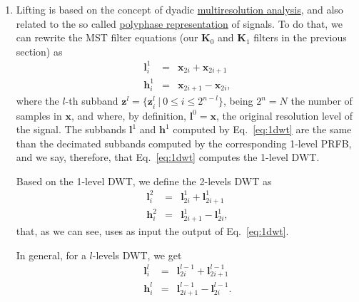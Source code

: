 \begin{enumerate}

\item Lifting is based on the concept of dyadic
  \href{https://en.wikipedia.org/wiki/Multiresolution_analysis}{multiresolution
    analysis}, and also related to the so called
  \href{https://en.wikipedia.org/wiki/Polyphase_matrix}{polyphase
    representation} of signals. To do that, we can rewrite
  the MST filter equations (our ${\mathbf K}_0$ and ${\mathbf K}_1$
  filters in the previous section) as
  \begin{equation}
    \begin{array}{rcl}
      {\mathbf l}^1_i & = & {\mathbf x}_{2i} + {\mathbf x}_{2i+1} \\
      {\mathbf h}^1_i & = & {\mathbf x}_{2i+1} - {\mathbf x}_{2i},
    \end{array}
    \label{eq:1dwt}
  \end{equation}
  where the $l$-th subband
  ${\mathbf z}^l=\{{\mathbf z}_i^l~|~0\le i\le 2^{n-l}\}$, being
  $2^n=N$ the number of samples in ${\mathbf x}$, and where, by
  definition, ${\mathbf l}^0={\mathbf x}$, the original resolution
  level of the signal. The subbands ${\mathbf l}^1$ and
  ${\mathbf h}^1$ computed by Eq.~\eqref{eq:1dwt} are the same than
  the decimated subbands computed by the corresponding 1-level PRFB,
  and we say, therefore, that Eq.~\eqref{eq:1dwt} computes the
  1-level DWT.

  Based on the 1-level DWT, we define the 2-levels DWT as
  \begin{equation}
    \begin{array}{rcl}
      {\mathbf l}^2_i & = & {\mathbf l}^1_{2i} + {\mathbf l}^1_{2i+1} \\
      {\mathbf h}^2_i & = & {\mathbf l}^1_{2i+1} - {\mathbf l}^1_{2i},
    \end{array}
    \label{eq:2dwt}
  \end{equation}
  that, as we can see, uses as input the output of Eq.~\eqref{eq:1dwt}.

  In general, for a $l$-levels DWT, we get
    \begin{equation}
    \begin{array}{rcl}
      {\mathbf l}^l_i & = & {\mathbf l}^{l-1}_{2i} + {\mathbf l}^{l-1}_{2i+1} \\
      {\mathbf h}^l_i & = & {\mathbf l}^{l-1}_{2i+1} - {\mathbf l}^{l-1}_{2i}.
    \end{array}
    \label{eq:ldwt}
  \end{equation}


\end{enumerate}
